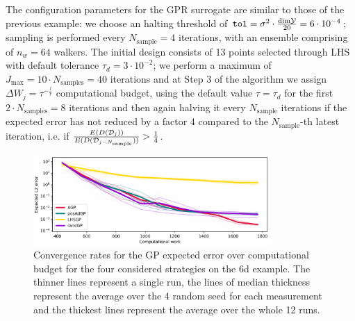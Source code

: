The configuration parameters for the GPR surrogate are similar to those of the previous example: we choose an halting threshold of $\texttt{tol} = \sigma^2 \cdot \frac{\text{dim} \mathcal Y }{20} = 6\cdot 10^{-4}$; sampling is performed every $N_{\text{sample}} = 4$ iterations, with an ensemble comprising of $n_w = 64$ walkers.
The initial design consists of 13 points selected through LHS with default tolerance $\tau_d = 3 \cdot 10^{-2}$; we perform a maximum of $J_{\max} = 10 \cdot N_{\text{samples}} = 40$ iterations and at Step 3 of the algorithm we assign $\Delta W_j = \tau ^{-\frac{l}{r}}$ computational budget, using the default value $\tau= \tau_d$ for the first $2\cdot N_{\text{samples}} = 8$ iterations and then again halving it every $N_{\text{sample}}$ iterations if the expected error has not reduced by a factor 4 compared to the $N_{\text{sample}}$-th latest iteration, i.e. if $\frac{E(D(\mathcal D_j))}{E(D(\mathcal D_{j-N_{\text{sample}}}))} > \frac{1}{4}$.

\begin{figure}[H]
\begin{center}
    \includegraphics[width=0.8\textwidth]{results/pictures/d6/GP_res.png}
\end{center}
\caption{Convergence rates for the GP expected error over computational budget for the four considered strategies on the 6d example. The thinner lines represent a single run, the lines of median thickness represent the average over the 4 random seed for each measurement and the thickest lines represent the average over the whole 12 runs.}
    \label{fig:6dGPconv}
\end{figure}

